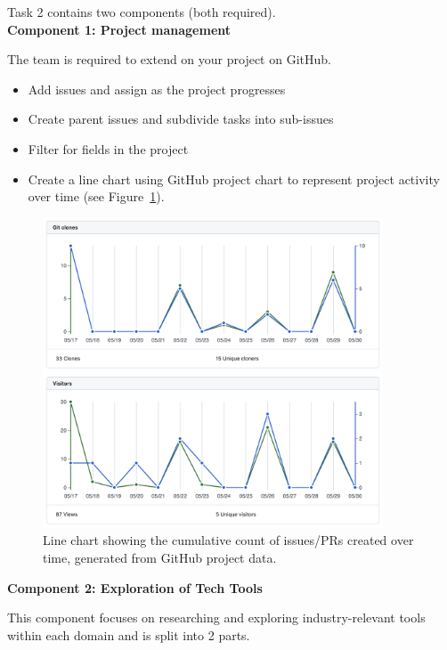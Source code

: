 \documentclass[a4paper, 11pt]{report}
\begin{document}
Task 2 contains two components (both required).\\[2mm]

\textbf{Component 1: Project management}

The team is required to extend on your project on GitHub.

\begin{itemize}
    \item Add issues and assign as the project progresses
    \item Create parent issues and subdivide tasks into sub-issues
    \item Filter for fields in the project
    \item Create a line chart using GitHub project chart to represent project activity over time (see Figure~\ref{fig:activity}).
\end{itemize} 

\begin{figure}[h!]
  \centering
  \includegraphics[width=0.9\textwidth]{github_activity.png}
  \caption{Line chart showing the cumulative count of issues/PRs created over time, generated from GitHub project data.}
  \label{fig:activity}
\end{figure}

\vspace{2ex}

\textbf{Component 2: Exploration of Tech Tools}

This component focuses on researching and exploring industry-relevant tools within each domain and is split into 2 parts.
\end{document}
